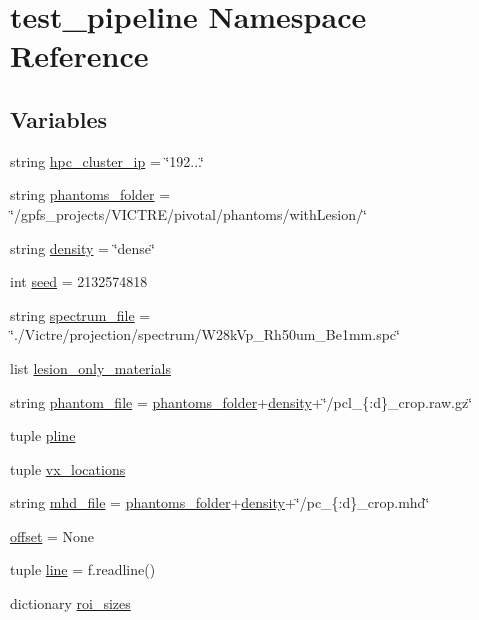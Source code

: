 \hypertarget{namespacetest__pipeline}{\section{test\-\_\-pipeline Namespace Reference}
\label{namespacetest__pipeline}
}
\subsection*{Variables}
\begin{DoxyCompactItemize}
\item 
string \hyperlink{namespacetest__pipeline_af92fee384c18b13c6673a89759d43ed0}{hpc\-\_\-cluster\-\_\-ip} = \char`\"{}192...\char`\"{}
\item 
string \hyperlink{namespacetest__pipeline_a5a533cd65e06752395913aef099f6f3a}{phantoms\-\_\-folder} = \char`\"{}/gpfs\-\_\-projects/V\-I\-C\-T\-R\-E/pivotal/phantoms/with\-Lesion/\char`\"{}
\item 
string \hyperlink{namespacetest__pipeline_ae1187c73a8652306ffcb6026d1c447a9}{density} = \char`\"{}dense\char`\"{}
\item 
int \hyperlink{namespacetest__pipeline_a2cc55609849787d81000c76439d285af}{seed} = 2132574818
\item 
string \hyperlink{namespacetest__pipeline_a04ba5a1d7ea995de9393c50eb14ef9ad}{spectrum\-\_\-file} = \char`\"{}./Victre/projection/spectrum/W28k\-Vp\-\_\-\-Rh50um\-\_\-\-Be1mm.\-spc\char`\"{}
\item 
list \hyperlink{namespacetest__pipeline_a9b60cd1b189b1d4b7ed5d792e12598db}{lesion\-\_\-only\-\_\-materials}
\item 
string \hyperlink{namespacetest__pipeline_a12b71fc499f0a1951e42b754b6cfa198}{phantom\-\_\-file} = \hyperlink{namespacetest__pipeline_a5a533cd65e06752395913aef099f6f3a}{phantoms\-\_\-folder}+\hyperlink{namespacetest__pipeline_ae1187c73a8652306ffcb6026d1c447a9}{density}+\char`\"{}/pcl\-\_\-\{\-:d\}\-\_\-crop.\-raw.\-gz\char`\"{}
\item 
tuple \hyperlink{namespacetest__pipeline_a4f34ebd50c5400c94a3b33124629e2fe}{pline}
\item 
tuple \hyperlink{namespacetest__pipeline_a0891497d3339772fa64ecb2ef3816a8a}{vx\-\_\-locations}
\item 
string \hyperlink{namespacetest__pipeline_ae843f1cf40718b92abe9429113865859}{mhd\-\_\-file} = \hyperlink{namespacetest__pipeline_a5a533cd65e06752395913aef099f6f3a}{phantoms\-\_\-folder}+\hyperlink{namespacetest__pipeline_ae1187c73a8652306ffcb6026d1c447a9}{density}+\char`\"{}/pc\-\_\-\{\-:d\}\-\_\-crop.\-mhd\char`\"{}
\item 
\hyperlink{namespacetest__pipeline_a0adaf87bfe7dc26e1a0d89f220fb981e}{offset} = None
\item 
tuple \hyperlink{namespacetest__pipeline_ae549bb444ef90158d4f47e0c3f8a17d0}{line} = f.\-readline()
\item 
dictionary \hyperlink{namespacetest__pipeline_ac3f90bba6b3ba7eb9c6c5fbf56f3f540}{roi\-\_\-sizes}
\end{DoxyCompactItemize}


